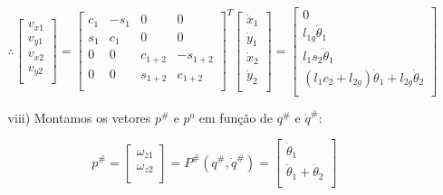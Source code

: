 \begin{itemize}
\begin{itemize}
	
	\begin{equation}
	\therefore
	\begin{bmatrix}
	v_{x1} \\
	v_{y1} \\
	v_{x2} \\
	v_{y2} \\
	\end{bmatrix}
	=
	\begin{bmatrix}
	c_1 & -s_1 & 0 & 0 \\
	s_1 & c_1 & 0 & 0 \\
	0 & 0 & c_{1+2} & -s_{1+2} \\
	0 & 0 & s_{1+2} & c_{1+2} \\
	\end{bmatrix}^T
	\begin{bmatrix}
	\dot{x}_1 \\
	\dot{y}_1 \\	
	\dot{x}_2 \\
	\dot{y}_2 \\	
	\end{bmatrix}
	=
	\begin{bmatrix}
	0 \\
	l_{1g} \dot{\theta}_1 \\
	l_1 s_2 \dot{\theta}_1\\
	(l_1 c_2 + l_{2g} )\dot{\theta}_1 + l_{2g} \dot{\theta}_2 \\
	\end{bmatrix}
	\end{equation}
	
	\item[viii)] Montamos os vetores $p^{\#}$ e $p^o$ em fun\c{c}\~ao de $q^{\#}$ e $\dot{q}^{\#}$:

	\begin{equation}
	p^{\#} = 
	\begin{bmatrix}
	\omega_{z1} \\
	\omega_{z2} \\
	\end{bmatrix}
	= P^{\#} (q^{\#}, \dot{q}^{\#} ) =
	\begin{bmatrix}
	\dot{\theta}_1 \\
	\dot{\theta}_1 +\dot{\theta}_2 \\
	\end{bmatrix}
	\end{equation}
	

\end{itemize}
\end{itemize}
